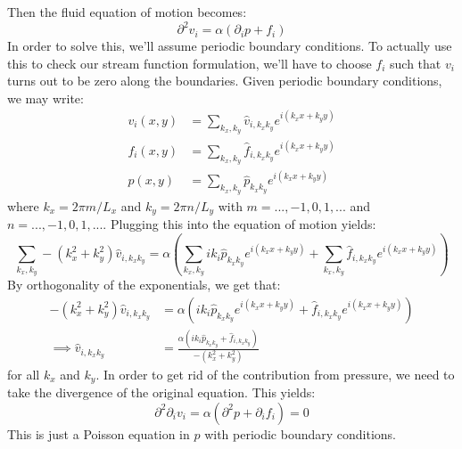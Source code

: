 \documentclass[reqno]{article}
\begin{document}
	Then the fluid equation of motion becomes:
	\begin{equation}\label{eq:fluid-laplace-equation}
		\partial^2 v_i = \alpha \left( \partial_i p + f_i \right)
	\end{equation}
	In order to solve this, we'll assume periodic boundary conditions. 
	To actually use this to check our stream function formulation, we'll have to choose $f_i$ such that $v_i$ turns out to be zero along the boundaries. 
	Given periodic boundary conditions, we may write:
	\begin{align}
		v_i (x, y) &= \sum_{k_x, k_y} \hat{v}_{i, k_x k_y} 
		e^{ i \left( k_x x + k_y y \right) } \\
		f_i (x, y) &= \sum_{k_x, k_y} \hat{f}_{i, k_x k_y}
		e^{ i \left( k_x x + k_y y \right) } \\
		p (x, y) &= \sum_{k_x, k_y} \hat{p}_{k_x k_y}
		e^{ i \left( k_x x + k_y y \right) }
	\end{align}
	where $k_x = 2\pi m/L_x$ and $k_y = 2\pi n/L_y$ with $m = ..., -1, 0, 1, ...$ and $n = ..., -1, 0, 1, ...$.
	Plugging this into the equation of motion yields:
	\begin{equation}
		\sum_{k_x, k_y} - \left( k_x^2 + k_y^2 \right) \hat{v}_{i, k_x k_y} =
		\alpha \left( 
		\sum_{k_x, k_y} i k_i \hat{p}_{k_x k_y}
		e^{ i \left( k_x x + k_y y \right) }
		+ \sum_{k_x, k_y} \hat{f}_{i, k_x k_y}
		e^{ i \left( k_x x + k_y y \right) }
		\right)
	\end{equation}
	By orthogonality of the exponentials, we get that:
	\begin{equation}
	\begin{split}
		- \left( k_x^2 + k_y^2 \right) \hat{v}_{i, k_x k_y} 
		&= \alpha \left( 
		i k_i \hat{p}_{k_x k_y}
		e^{ i \left( k_x x + k_y y \right) }
		+ \hat{f}_{i, k_x k_y}
		e^{ i \left( k_x x + k_y y \right) }
		\right) \\
		\implies
		\hat{v}_{i, k_x k_y}
		&= \frac{ \alpha \left(
		i k_i \hat{p}_{k_x k_y}
		+ \hat{f}_{i, k_x k_y} 
		\right) }
		{ - \left( k_x^2 + k_y^2 \right) }
	\end{split}
	\end{equation}
	for all $k_x$ and $k_y$. 
	In order to get rid of the contribution from pressure, we need to take the divergence of the original equation.
	This yields:
	\begin{equation}
		\partial^2 \partial_i v_i
		= \alpha \left(
		\partial^2 p + \partial_i f_i
		\right)
		= 0
	\end{equation}
	This is just a Poisson equation in $p$ with periodic boundary conditions.
\end{document}
